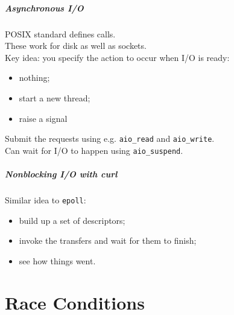 \documentclass[aspectratio=43]{beamer}
\newenvironment{changemargin}[1]{%
  \begin{list}{}{%
    \setlength{\topsep}{0pt}%
    \setlength{\leftmargin}{#1}%
    \setlength{\rightmargin}{1em}
    \setlength{\listparindent}{\parindent}%
    \setlength{\itemindent}{\parindent}%
    \setlength{\parsep}{\parskip}%
  }%
  \item[]}{\end{list}}
\begin{document}
\begin{frame}
  \frametitle{Asynchronous I/O}
  \begin{changemargin}{2em}
    POSIX standard defines  calls.\\[1em]

    These work for disk as well as sockets.\\[1em]

    Key idea: you specify the action to occur when I/O is ready:
    \begin{itemize}
      \item nothing;
      \item start a new thread;
      \item raise a signal
    \end{itemize}

    Submit the requests using e.g. {\tt aio\_read} and {\tt aio\_write}.\\[1em]
    Can wait for I/O to happen using {\tt aio\_suspend}.
  \end{changemargin}
\end{frame}

\begin{frame}
  \frametitle{Nonblocking I/O with curl}
  \begin{changemargin}{2em}
    Similar idea to {\tt epoll}:
\begin{itemize}
\item build up a set of descriptors;
\item invoke the transfers and wait for them to finish;
\item see how things went.
\end{itemize}
  \end{changemargin}
\end{frame}


\part{Race Conditions}
\frame{\partpage}
\end{document}
